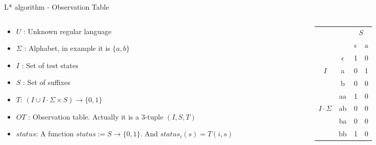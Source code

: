 \documentclass{beamer}
\begin{document}
\begin{frame}{L* algorithm - Observation Table }
\begin{columns}[T]

    \begin{column}{0.6\textwidth}
        \begin{itemize}
            \item $U$ : Unknown regular language
            \item $\Sigma$ : Alphabet, in example it is $\{a,b\}$
            \item $I$ : Set of test states
            \item $S$ : Set of suffixes
            \item $T$: $(I \cup I \cdot \Sigma \times S) \to \{0,1\}$
            \item $OT$ : {\small Observation table. Actually it is a 3-tuple } $(I,S,T)$
            \item $status$: A function $status:= S \rightarrow\{0,1\}$. And $status_i(s) = T(i,s)$
        \end{itemize}
    \end{column}

    \begin{column}{0.6\textwidth}
        \centering
        \begin{tabular}{cc|c|c}
            &   & \multicolumn{2}{c}{$S$} \\ %
            \multicolumn{2}{c|}{} & $\epsilon$ & a \\ \hline
            & $\epsilon$ & 1 & 0 \\
            {$I$}& a          & 0 & 1 \\
            & b          & 0 & 0 \\\hline
            
            & aa& 1& 0 \\
{$I\cdot \Sigma$}        & ab& 0&0\\
            & ba         & 0 & 0 \\
            & bb         & 1 & 0 \\ 
           
            
        \end{tabular}
    \end{column}
    
\end{columns}
\end{frame}
\end{document}
